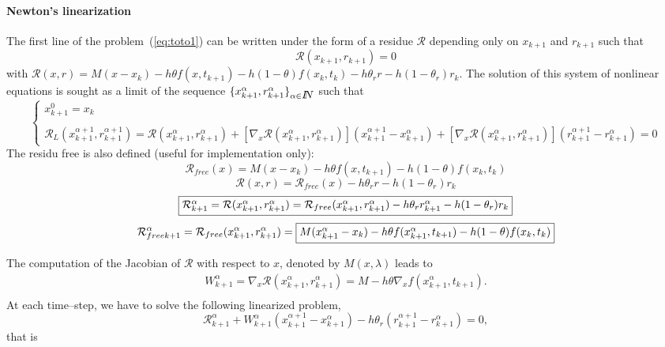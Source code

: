  \paragraph{Newton's linearization} The first line of the  problem~(\ref{eq:toto1}) can be written under the form of a residue $\mathcal R$ depending only on $x_{k+1}$ and $r_{k+1}$ such that 
\begin{equation}
  \label{eq:NL23}
  \mathcal R (x_{k+1},r _{k+1}) =0
\end{equation}
with $\mathcal R(x,r) = M (x - x_{k}) -h\theta f( x , t_{k+1}) - h(1-\theta)f(x_k,t_k) - h\theta _r r
- h(1-\theta_r)r_k$.
The solution of this system of nonlinear equations is sought as a limit of the sequence $\{ x^{\alpha}_{k+1},r^{\alpha}_{k+1} \}_{\alpha \in \mbox{\rm $I\!\!N$}}$ such that
 \begin{equation}
   \label{eq:NL27}
   \begin{cases}
     x^{0}_{k+1} = x_k \\ \\
     \mathcal R_L( x^{\alpha+1}_{k+1},r^{\alpha+1}_{k+1}) = \mathcal
     R(x^{\alpha}_{k+1},r^{\alpha}_{k+1})  + \left[ \nabla_{x} \mathcal
     R(x^{\alpha}_{k+1},r^{\alpha}_{k+1})\right] (x^{\alpha+1}_{k+1}-x^{\alpha}_{k+1} ) +
     \left[ \nabla_{x} \mathcal R(x^{\alpha}_{k+1},r^{\alpha}_{k+1})\right] (r^{\alpha+1}_{k+1} - r^{\alpha}_{k+1} ) =0
 \end{cases}
\end{equation}
The residu free is also defined (useful for implementation only):
\[\mathcal R _{free}(x) =  M (x - x_{k}) -h\theta f( x , t_{k+1}) - h(1-\theta)f(x_k,t_k)\]
\[\mathcal R (x,r) = \mathcal R _{free}(x)   - h\theta _r r - h(1-\theta_r)r_k\]
\[ \fbox{$\mathcal R^{\alpha}_{k+1} = \mathcal R (x^{\alpha}_{k+1},r^{\alpha}_{k+1}) = \mathcal R
_{free}(x^{\alpha}_{k+1},r^{\alpha}_{k+1} )  - h\theta _r r^{\alpha}_{k+1} - h(1-\theta_r)r_k$}\]
\[ \mathcal R _{free k+1} ^{\alpha} = \mathcal R
_{free}(x^{\alpha}_{k+1},r^{\alpha}_{k+1} )=\fbox{$M(x^{\alpha}_{k+1} - x_{k}) -h\theta f( x^{\alpha}_{k+1} , t_{k+1}) - h(1-\theta)f(x_k,t_k)$}\]
 
The computation of the Jacobian of $\mathcal R$ with respect to $x$, denoted by $M(x,\lambda)$ leads to 
\begin{equation}
   \label{eq:NL29}
   \begin{array}{l}
    W^{\alpha}_{k+1}= \nabla_{x} \mathcal R (x^{\alpha}_{k+1},r^{\alpha}_{k+1})= M - h  \theta \nabla_{x} f(  x^{\alpha}_{k+1}, t_{k+1} ).\\
 \end{array}
\end{equation}
At each time--step, we have to solve the following linearized problem,
\begin{equation}
   \label{eq:NL210}
    \mathcal R^{\alpha}_{k+1} + W^{\alpha}_{k+1} (x^{\alpha+1}_{k+1} -
    x^{\alpha}_{k+1}) - h \theta _r (r^{\alpha+1}_{k+1} - r^{\alpha}_{k+1} )  =0 ,
\end{equation}
that is

